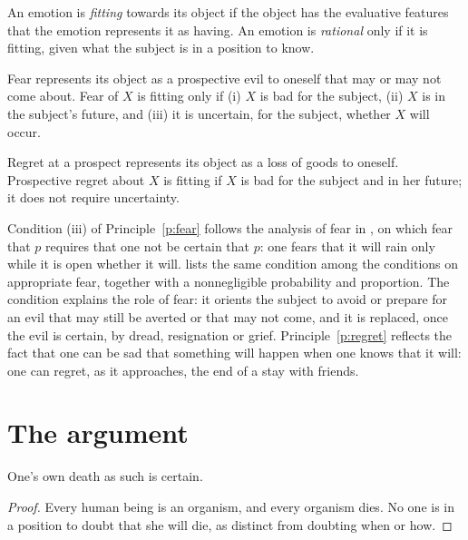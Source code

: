 \documentclass{situationist-preprint}
\begin{document}
\begin{definition}[Fittingness]\label{d:fit}
An emotion is \emph{fitting} towards its object if the object has the evaluative features that the emotion represents it as having. An emotion is \emph{rational} only if it is fitting, given what the subject is in a position to know.
\end{definition}

\begin{principle}[Fear]\label{p:fear}
Fear represents its object as a prospective evil to oneself that may or may not come about. Fear of $X$ is fitting only if (i) $X$ is bad for the subject, (ii) $X$ is in the subject's future, and (iii) it is uncertain, for the subject, whether $X$ will occur.
\end{principle}

\begin{principle}[Regret]\label{p:regret}
Regret at a prospect represents its object as a loss of goods to oneself. Prospective regret about $X$ is fitting if $X$ is bad for the subject and in her future; it does not require uncertainty.
\end{principle}

Condition (iii) of Principle~\ref{p:fear} follows the analysis of fear in \citet{Gordon1987}, on which fear that $p$ requires that one not be certain that $p$: one fears that it will rain only while it is open whether it will. \citet{Kagan2012} lists the same condition among the conditions on appropriate fear, together with a nonnegligible probability and proportion. The condition explains the role of fear: it orients the subject to avoid or prepare for an evil that may still be averted or that may not come, and it is replaced, once the evil is certain, by dread, resignation or grief. Principle~\ref{p:regret} reflects the fact that one can be sad that something will happen when one knows that it will: one can regret, as it approaches, the end of a stay with friends.

\section{The argument}

\begin{lemma}\label{l:certain}
One's own death as such is certain.
\end{lemma}

\begin{proof}
Every human being is an organism, and every organism dies. No one is in a position to doubt that she will die, as distinct from doubting when or how.
\end{proof}
\end{document}
